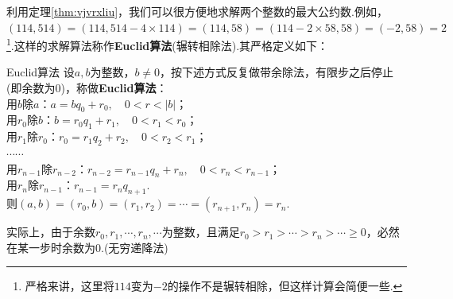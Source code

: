 \documentclass[lang=cn, zihao=5]{elegantbook}
\begin{document}
利用定理\ref{thm:vjvrxliu}，我们可以很方便地求解两个整数的最大公约数.例如，$(114,514)=(114,514-4\times 114) = (114,58) = (114-2\times 58 ,58)=(-2,58)=2$\footnote{严格来讲，这里将$114$变为$-2$的操作不是辗转相除，但这样计算会简便一些.}.这样的求解算法称作\textbf{Euclid算法}(辗转相除法).其严格定义如下：

\begin{theorem}{Euclid算法}
	设$a,b$为整数，$b \neq 0$，按下述方式反复做带余除法，有限步之后停止(即余数为$0$)，称做\textbf{Euclid算法}： \\
	用$b$除$a$：$a=bq_0+r_0,\quad 0<r<|b|$； \\
	用$r_0$除$b$：$b=r_0q_1+r_1,\quad 0<r_1<r_0$； \\
	用$r_1$除$r_0$：$r_0=r_1q_2+r_2,\quad 0<r_2<r_1$； \\
	$\cdots \cdots$ \\
	用$r_{n-1}$除$r_{n-2}$：$r_{n-2}=r_{n-1}q_n+r_n,\quad 0<r_n<r_{n-1}$； \\
	用$r_n$除$r_{n-1}$：$r_{n-1}=r_nq_{n+1}$. \\
	则$(a,b)=(r_0,b)=(r_1,r_2)= \cdots = (r_{n+1},r_n)=r_n$.
\end{theorem}
\begin{remark}
	实际上，由于余数$r_0,r_1,\cdots ,r_n,\cdots $为整数，且满足$r_0 > r_1 > \cdots > r_{n} > \cdots \geq 0$，必然在某一步时余数为$0$.(无穷递降法)
\end{remark}
\end{document}
